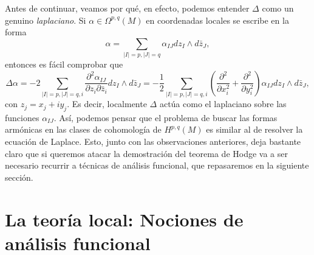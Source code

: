 \documentclass[12pt,a4paper]{article}
\theoremstyle{definition} \newtheorem{defn}[thm]{Definición}
\theoremstyle{definition} \newtheorem{ejemplo}[thm]{Ejemplo}
\theoremstyle{definition} \newtheorem{ejercicio}[thm]{Ejercicio}
\theoremstyle{remark} \newtheorem*{obs}{Observación}
\begin{document}
 Antes de continuar, veamos por qué, en efecto, podemos entender $\Delta$ como un genuino \emph{laplaciano}. Si $\alpha \in \Omega^{p,q}(M)$ en coordenadas locales se escribe en la forma
 \begin{equation*}
   \alpha = \sum_{|I|=p, |J|=q} \alpha_{IJ} dz_I \wedge d\bar{z}_J,
 \end{equation*}
 entonces es fácil comprobar que
 \begin{equation*}
   \Delta \alpha = -2 \sum_{|I|=p, |J|=q,i} \frac{\partial^2 \alpha_{IJ}}{\partial z_i \partial \bar{z}_i} dz_I \wedge d\bar{z}_J= -\frac{1}{2}\sum_{|I|=p, |J|=q,i}\left( \frac{\partial^2}{\partial x_i^2} + \frac{\partial^2}{\partial y_i^2} \right) \alpha_{IJ} dz_I \wedge d\bar{z}_J,
 \end{equation*}
 con $z_j=x_j+iy_j$.
 Es decir, localmente $\Delta$ actúa como el laplaciano sobre las funciones $\alpha_{IJ}$. Así, podemos pensar que el problema de buscar las formas armónicas en las clases de cohomología de $H^{p,q}(M)$ es similar al de resolver la ecuación de Laplace. Esto, junto con las observaciones anteriores, deja bastante claro que si queremos atacar la demostración del teorema de Hodge va a ser necesario recurrir a técnicas de análisis funcional, que repasaremos en la siguiente sección.

 \section{La teoría local: Nociones de análisis funcional}
\end{document}
